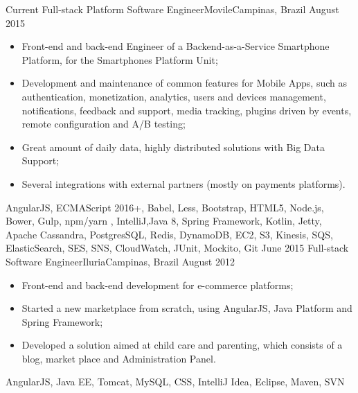 %
%
%

\begin{experiences}
  \experience
    {Current}   {Full-stack Platform Software Engineer}{Movile}{Campinas, Brazil}
    {August 2015} {
    \begin{itemize}
      \item Front-end and back-end Engineer of a Backend-as-a-Service Smartphone Platform,
      for the Smartphones Platform Unit;
      \item Development and maintenance of common features for Mobile Apps, such as authentication,
      monetization, analytics, users and devices management, notifications, feedback and support,
      media tracking, plugins driven by events, remote configuration and A/B testing;
      \item Great amount of daily data, highly distributed solutions with Big Data Support;
      \item Several integrations with external partners (mostly on payments platforms).\\
    \end{itemize}
  }
  {AngularJS, ECMAScript 2016+, Babel, Less, Bootstrap, HTML5, Node.js, Bower, Gulp, npm/yarn , IntelliJ,Java 8, Spring Framework, Kotlin, Jetty, Apache Cassandra, PostgresSQL, Redis, DynamoDB, EC2, S3, Kinesis, SQS, ElasticSearch, SES, SNS, CloudWatch, JUnit, Mockito, Git}
  \emptySeparator
  \experience
    {June 2015} {Full-stack Software Engineer}{Iluria}{Campinas, Brazil}
    {August 2012}    {
      \begin{itemize}
        \item Front-end and back-end development for e-commerce platforms;
        \item Started a new marketplace from scratch, using AngularJS, Java Platform and Spring Framework;
        \item Developed a solution aimed at child care and parenting, which consists of a blog, market place and Administration Panel.\\
      \end{itemize}
    }{AngularJS, Java EE, Tomcat, MySQL, CSS, IntelliJ Idea, Eclipse, Maven, SVN}
  \emptySeparator

\end{experiences}
